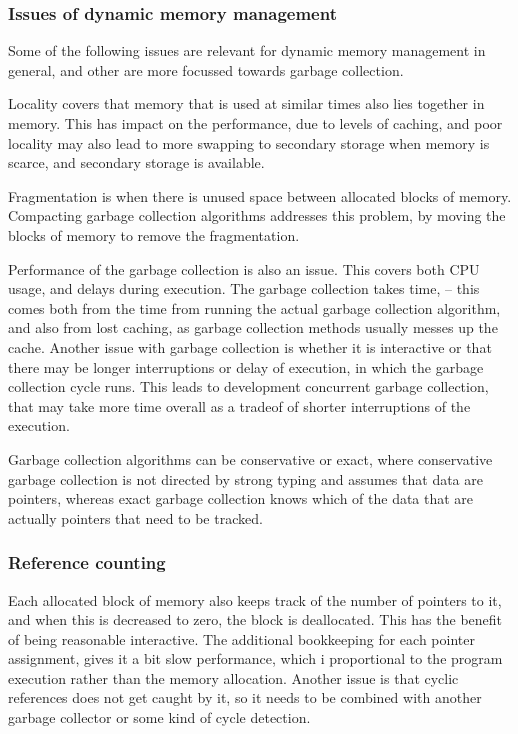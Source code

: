\documentclass[11pt]{report}
\begin{document}
\subsubsection{Issues of dynamic memory management}
Some of the following issues are relevant for dynamic memory management in general, and other are more focussed towards garbage collection.

Locality covers that memory that is used at similar times also lies together in memory.  This has impact on the performance, due to levels of caching, and poor locality may also lead to more swapping to secondary storage when memory is scarce, and secondary storage is available.

Fragmentation is when there is unused space between allocated blocks of memory. 
Compacting garbage collection algorithms addresses this problem, by moving the blocks of memory to remove the fragmentation.

Performance of the garbage collection is also an issue. This covers both CPU usage, and delays during execution.
The garbage collection takes time, -- this comes both from the time from running the actual garbage collection algorithm, and also from lost caching, as garbage collection methods usually messes up the cache.
Another issue with garbage collection is whether it is interactive or that there may be longer interruptions or delay of execution, in which the garbage collection cycle runs. This leads to development concurrent garbage collection, that may take more time overall as a tradeof of shorter interruptions of the execution.

Garbage collection algorithms can be conservative or exact, where conservative garbage collection is not directed by strong typing and assumes that data are pointers, whereas exact garbage collection knows which of the data that are actually pointers that need to be tracked.

\subsubsection{Reference counting}

Each allocated block of memory also keeps track of the number of pointers to it, and when this is decreased to zero, the block is deallocated.
This has the benefit of being reasonable interactive.
The additional bookkeeping for each pointer assignment, gives it a bit slow performance, which i proportional to the program execution rather than the memory allocation. 
Another issue is that cyclic references does not get caught by it, so it needs to be combined with another garbage collector or some kind of cycle detection.
\end{document}
